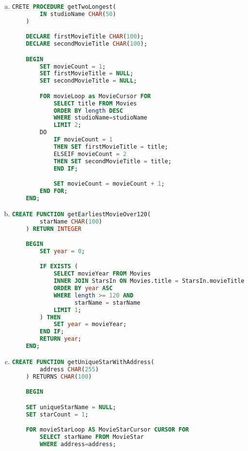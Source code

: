 \documentclass[12pt]{article}
\begin{document}
\begin{enumerate}[1.]
\begin{enumerate}[a)]
        \item

    \begin{lstlisting}[language=SQL]
    CRETE PROCEDURE getTwoLongest(
        IN studioName CHAR(50)
    )

    DECLARE firstMovieTitle CHAR(100);
    DECLARE secondMovieTitle CHAR(100);

    BEGIN
        SET movieCount = 1;
        SET firstMovieTitle = NULL;
        SET secondMovieTitle = NULL;

        FOR movieLoop as MovieCursor FOR
            SELECT title FROM Movies
            ORDER BY length DESC
            WHERE studioName=studioName
            LIMIT 2;
        DO
            IF movieCount = 1
            THEN SET firstMovieTitle = title;
            ELSEIF movieCount = 2
            THEN SET secondMovieTitle = title;
            END IF;

            SET movieCount = movieCount + 1;
        END FOR;
    END;
    \end{lstlisting}

        \item

    \begin{lstlisting}[language=SQL]
    CREATE FUNCTION getEarliestMovieOver120(
        starName CHAR(100)
    ) RETURN INTEGER

    BEGIN
        SET year = 0;

        IF EXISTS (
            SELECT movieYear FROM Movies
            INNER JOIN StarsIn ON Movies.title = StarsIn.movieTitle
            ORDER BY year ASC
            WHERE length >= 120 AND
                  starName = starName
            LIMIT 1;
        ) THEN
            SET year = movieYear;
        END IF;
        RETURN year;
    END;

    \end{lstlisting}

        \item

    \begin{lstlisting}[language=SQL]
    CREATE FUNCTION getUniqueStarWithAddress(
        address CHAR(255)
    ) RETURNS CHAR(100)

    BEGIN

    SET uniqueStarName = NULL;
    SET starCount = 1;

    FOR movieStarLoop AS MovieStarCursor CURSOR FOR
        SELECT starName FROM MovieStar
        WHERE address=address;


\end{lstlisting}
\end{enumerate}
\end{enumerate}
\end{document}
